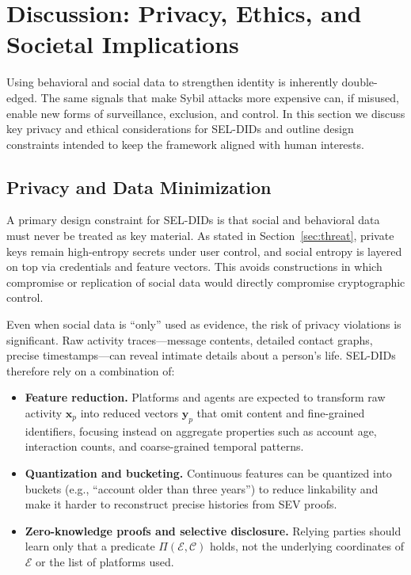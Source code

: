 \documentclass[11pt]{article}
\begin{document}
\section{Discussion: Privacy, Ethics, and Societal Implications}
\label{sec:discussion}

Using behavioral and social data to strengthen identity is inherently double-edged. The same signals that make Sybil attacks more expensive can, if misused, enable new forms of surveillance, exclusion, and control. In this section we discuss key privacy and ethical considerations for SEL-DIDs and outline design constraints intended to keep the framework aligned with human interests.

\subsection{Privacy and Data Minimization}

A primary design constraint for SEL-DIDs is that social and behavioral data must never be treated as key material. As stated in Section~\ref{sec:threat}, private keys remain high-entropy secrets under user control, and social entropy is layered on top via credentials and feature vectors. This avoids constructions in which compromise or replication of social data would directly compromise cryptographic control.

Even when social data is ``only'' used as evidence, the risk of privacy violations is significant. Raw activity traces---message contents, detailed contact graphs, precise timestamps---can reveal intimate details about a person's life. SEL-DIDs therefore rely on a combination of:

\begin{itemize}
  \item \textbf{Feature reduction.} Platforms and agents are expected to transform raw activity $\mathbf{x}_p$ into reduced vectors $\mathbf{y}_p$ that omit content and fine-grained identifiers, focusing instead on aggregate properties such as account age, interaction counts, and coarse-grained temporal patterns.
  \item \textbf{Quantization and bucketing.} Continuous features can be quantized into buckets (e.g., ``account older than three years'') to reduce linkability and make it harder to reconstruct precise histories from SEV proofs.
  \item \textbf{Zero-knowledge proofs and selective disclosure.} Relying parties should learn only that a predicate $\Pi(\mathcal{E}, \mathcal{C})$ holds, not the underlying coordinates of $\mathcal{E}$ or the list of platforms used.
\end{itemize}
\end{document}
